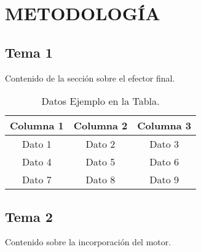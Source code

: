 \chapter{METODOLOGÍA}
\section{Tema 1}
Contenido de la sección sobre el efector final.

\begin{table}[H]
    \centering
    \caption{Datos Ejemplo en la Tabla.}
    \begin{tabular}{|c|c|c|}
        \hline
        Columna 1 & Columna 2 & Columna 3 \\ \hline
        Dato 1    & Dato 2    & Dato 3    \\ \hline
        Dato 4    & Dato 5    & Dato 6    \\ \hline
        Dato 7    & Dato 8    & Dato 9    \\ \hline
    \end{tabular}
    
    \label{tab:ejemplo}
\end{table}

\section{Tema 2}
Contenido sobre la incorporación del motor.
